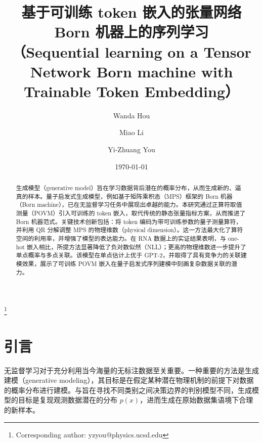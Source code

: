 \documentclass[aps,prb,twocolumn,superscriptaddress]{revtex4-2}
\begin{document}
\setlength{\parindent}{2em}
\renewcommand{\refname}{参考文献}
\renewcommand{\figurename}{图}
\renewcommand{\tablename}{表}
\renewcommand{\acknowledgmentsname}{致谢}

\title{基于可训练 token 嵌入的张量网络 Born 机器上的序列学习\\
（Sequential learning on a Tensor Network Born machine with Trainable Token Embedding）}

\author{Wanda Hou}
\author{Miao Li}
\author{Yi-Zhuang You}
\thanks{Corresponding author: yzyou@physics.ucsd.edu}
\date{\today}

\begin{abstract}
 生成模型（generative model）旨在学习数据背后潜在的概率分布，从而生成新的、逼真的样本。量子启发式生成模型，例如基于矩阵乘积态（MPS）框架的 Born 机器（Born machine），已在无监督学习任务中展现出卓越的能力。本研究通过正算符取值测量（POVM）引入可训练的 token 嵌入，取代传统的静态张量指标方案，从而推进了 Born 机器范式。关键技术创新包括：将 token 编码为带可训练参数的量子测量算符，并利用 QR 分解调整 MPS 的物理维数（physical dimension）。这一方法最大化了算符空间的利用率，并增强了模型的表达能力。在 RNA 数据上的实证结果表明，与 one-hot 嵌入相比，所提方法显著降低了负对数似然（NLL）；更高的物理维数进一步提升了单点概率与多点关联。该模型在单点估计上优于 GPT-2，并取得了具有竞争力的关联建模效果，展示了可训练 POVM 嵌入在量子启发式序列建模中刻画复杂数据关联的潜力。
\end{abstract}

\maketitle

\section{引言}

无监督学习对于充分利用当今海量的无标注数据至关重要。一种重要的方法是生成建模（generative modeling），其目标是在假定某种潜在物理机制的前提下对数据的概率分布进行建模\cite{lecun2015deep,2019RvMP...91d5002C}。与旨在寻找不同类别之间决策边界的判别模型不同，生成模型的目标是复现观测数据潜在的分布 $p(x)$，进而生成在原始数据集语境下合理的新样本。
\end{document}
